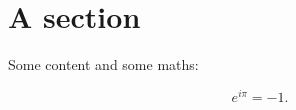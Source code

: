 \section{A section}

Some content and some maths:

\begin{equation}
    e^{i\pi} = -1.
\end{equation}